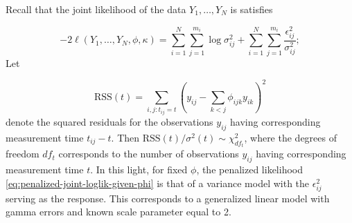 

Recall that the joint likelihood of the data $Y_1,\dots, Y_N$ is satisfies

\begin{equation} \label{eq:penalized-joint-loglik-given-phi-2}
-2\ell\left( Y_1,\dots, Y_N, \phi, \kappa \right) =  \sum_{i = 1}^N \sum_{j = 1}^{m_i} \log \sigma^2_{ij}  + \sum_{i = 1}^N \sum_{j = 1}^{m_i} \frac {\epsilon_{ij}^2}{\sigma^2_{ij}};
\end{equation}
\noindent
Let 

\begin{equation}
\mbox{RSS}\left( t \right) = \sum_{i,j:t_{ij}= t} \left( y_{ij} - \sum_{k<j} \phi_{ijk} y_{ik}\right)^2
\end{equation}
\noindent
denote the squared residuals for the observations $y_{ij}$ having corresponding measurement time $t_{ij} - t$. Then $\mbox{RSS}\left( t \right)/\sigma^2\left(t\right) \sim \chi^2_{df_t}$, where the degrees of freedom $df_{t}$ corresponds to the number of observations $y_{ij}$ having corresponding measurement time $t$. In this light, for fixed $\phi$, the penalized likelihood \ref{eq:penalized-joint-loglik-given-phi} is that of a variance model with the $\epsilon_{ij}^2$ serving as the response. This corresponds to a generalized linear model with gamma errors and known scale parameter equal to 2.



